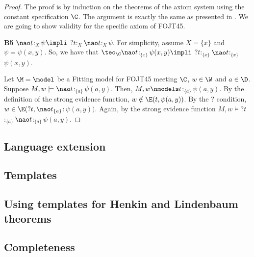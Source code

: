 \begin{proof}
The proof is by induction on the theorems of the axiom system using the constant specification $\C$. The argument is exactly the same as presented in \cite[p.9-10]{Fitting14}. We are going to show validity for the specific axiom of FOJT45.
	
\textbf{B5} $\nao t$$:_{X}$$\psi \impli$ $?t$$:_{X}$$\nao t$$:_{X}$$\psi$. For simplicity, assume $X= \{x\}$ and $\psi = \psi(x,y)$. So, we have that $\teo_{\C}\nao t$$:_{\{x\}}$$\psi(x,y) \impli$ $?t$$:_{\{x\}}$$\nao t$$:_{\{x\}}$$\psi(x,y)$.

\qquad Let $\M = \model$ be a Fitting model for FOJT45 meeting $\C$, $w \in \W$ and $a \in \D$. Suppose $M, w \models \nao t$$:_{\{a\}}$$\psi(a,y)$. Then, $M, w \nmodels t$$:_{\{a\}}$$\psi(a,y)$. By the definition of the strong evidence function, $w \notin \E (t, \psi(a,y))$. By the ? condition, $w \in \E(?t,\nao t_{\{a\}}$$:\psi(a,y))$. Again, by the strong evidence function $M, w \models ?t$$:_{\{a\}}$$\nao t$$:_{\{a\}}$$\psi(a,y)$.
	
\end{proof}


\subsection{Language extension}



\subsection{Templates}


\subsection{Using templates for Henkin and Lindenbaum theorems}


\subsection{Completeness}



















